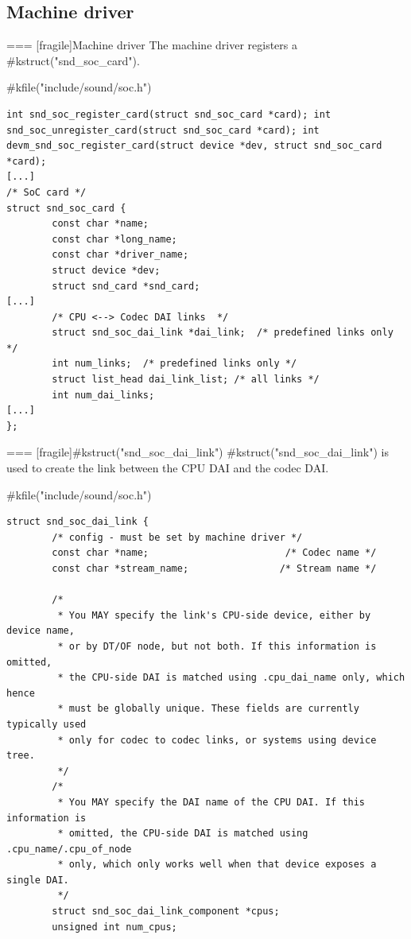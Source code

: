 \subsection{Machine driver}

=== [fragile]{Machine driver}
The machine driver registers a #kstruct("snd_soc_card").
      \begin{block}{#kfile("include/sound/soc.h")}
        \fontsize{8}{8}\selectfont
        \begin{verbatim}
int snd_soc_register_card(struct snd_soc_card *card); int snd_soc_unregister_card(struct snd_soc_card *card); int devm_snd_soc_register_card(struct device *dev, struct snd_soc_card *card);
[...]
/* SoC card */
struct snd_soc_card {
        const char *name;
        const char *long_name;
        const char *driver_name;
        struct device *dev;
        struct snd_card *snd_card;
[...]
        /* CPU <--> Codec DAI links  */
        struct snd_soc_dai_link *dai_link;  /* predefined links only */
        int num_links;  /* predefined links only */
        struct list_head dai_link_list; /* all links */
        int num_dai_links;
[...]
};
        \end{verbatim}
      \end{block}


=== [fragile]{#kstruct("snd_soc_dai_link")}
#kstruct("snd_soc_dai_link") is used to create the link between the
  CPU DAI and the codec DAI.
  \begin{block}{#kfile("include/sound/soc.h")}
    \fontsize{8}{8}\selectfont
    \begin{verbatim}
struct snd_soc_dai_link {
        /* config - must be set by machine driver */
        const char *name;                        /* Codec name */
        const char *stream_name;                /* Stream name */

        /*
         * You MAY specify the link's CPU-side device, either by device name,
         * or by DT/OF node, but not both. If this information is omitted,
         * the CPU-side DAI is matched using .cpu_dai_name only, which hence
         * must be globally unique. These fields are currently typically used
         * only for codec to codec links, or systems using device tree.
         */
        /*
         * You MAY specify the DAI name of the CPU DAI. If this information is
         * omitted, the CPU-side DAI is matched using .cpu_name/.cpu_of_node
         * only, which only works well when that device exposes a single DAI.
         */
        struct snd_soc_dai_link_component *cpus;
        unsigned int num_cpus;
     \end{verbatim}
   \end{block}


